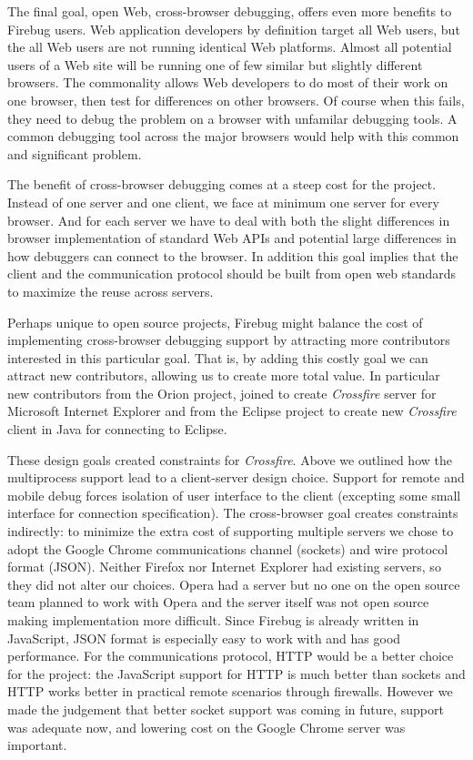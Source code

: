 The final goal, open Web, cross-browser debugging, offers even more benefits to
Firebug users.  Web application developers by definition target all Web users,
but the all Web users are not running identical Web platforms. Almost all
potential users of a Web site will be running one of few similar but slightly
different browsers. The commonality allows Web developers to do most of their
work on one browser, then test for differences on other browsers. Of course when
this fails, they need to debug the problem on a browser with unfamilar debugging
tools. A common debugging tool across the major browsers would help with this
common and significant problem.

The benefit of cross-browser debugging comes at a steep cost for the project.
Instead of one server and one client, we face at minimum one server for every
browser. And for each server we have to deal with both the slight differences in
browser implementation of standard Web APIs and potential large differences in
how debuggers can connect to the browser. In addition this goal implies that the
client and the communication protocol should be built from open web standards to
maximize the reuse across servers.

Perhaps unique to open source projects, Firebug might balance the cost of
implementing cross-browser debugging support by attracting more contributors
interested in this particular goal. That is, by adding this costly goal we can
attract new contributors, allowing us to create more total value. In particular
new contributors from the Orion project\cite{orion}, joined to create
\textit{Crossfire} server for Microsoft Internet Explorer and from the Eclipse
project\cite{EclipseJSDT} to create new \textit{Crossfire} client in Java for
connecting to Eclipse.

These design goals created constraints for \textit{Crossfire}. Above we outlined
how the multiprocess support lead to a client-server design choice. Support for
remote and mobile debug forces isolation of user interface to the client
(excepting some small interface for connection specification). The cross-browser
goal creates constraints indirectly: to minimize the extra cost of supporting
multiple servers we chose to adopt the Google Chrome communications channel
(sockets) and wire protocol format (JSON). Neither Firefox nor Internet Explorer
had existing servers, so they did not alter our choices. Opera had a server but
no one on the open source team planned to work with Opera and the server itself
was not open source making implementation more difficult.  Since Firebug is
already written in JavaScript, JSON format is especially easy to work with and
has good performance\cite{JSON}.  For the communications protocol, HTTP would be
a better choice for the project: the JavaScript support for HTTP is much better
than sockets and HTTP works better in practical remote scenarios through
firewalls.  However we made the judgement that better socket support was coming
in future\cite{WebSockets}, support was adequate now, and lowering cost on the
Google Chrome server was important.
